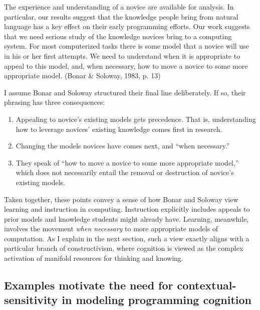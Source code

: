 The experience and understanding of a novice are available for analysis.
In particular, our results suggest that the knowledge people bring from
natural language has a key effect on their early programming efforts.
Our work suggests that we need serious study of the knowledge novices
bring to a computing system. For most computerized tasks there is some
model that a novice will use in his or her first attempts. We need to
understand when it is appropriate to appeal to this model, and, when
necessary, how to move a novice to some more appropriate model. (Bonar
\& Soloway, 1983, p. 13)

I assume Bonar and Soloway structured their final line deliberately. If
so, their phrasing has three consequences:

\begin{enumerate}
\def\labelenumi{\arabic{enumi}.}
\item
  Appealing to novice's existing models gets precedence. That is,
  understanding how to leverage novices' existing knowledge comes first
  in research.
\item
  Changing the models novices have comes next, and ``when necessary.''
\item
  They speak of ``how to move a novice to some more appropriate model,''
  which does not necessarily entail the removal or destruction of
  novice's existing models.
\end{enumerate}

Taken together, these points convey a sense of how Bonar and Soloway
view learning and instruction in computing. Instruction explicitly
includes appeals to prior models and knowledge students might already
have. Learning, meanwhile, involves the movement \emph{when necessary}
to more appropriate models of computation. As I explain in the next
section, such a view exactly aligns with a particular branch of
constructivism, where cognition is viewed as the complex activation of
manifold resources for thinking and knowing.

\subsection{Examples motivate the need for contextual-sensitivity in
modeling programming
cognition}\label{examples-motivate-the-need-for-contextual-sensitivity-in-modeling-programming-cognition}

